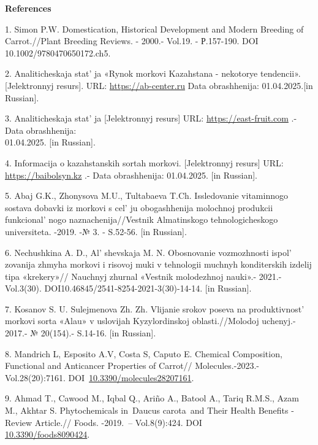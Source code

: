 \begin{center}
{\bfseries References}
\end{center}

\begin{refs}
1. Simon P.W. Domestication, Historical Development and Modern Breeding
of Carrot.//Plant Breeding Reviews. - 2000.- Vol.19. - Р.157-190. DOI
10.1002/9780470650172.ch5.

2. Analiticheskaja stat' ja «Rynok morkovi Kazahstana -
nekotorye tendencii». {[}Jelektronnyj resurs{]}.
URL: \href{https://ab-center.ru/news/rynok-morkovi-kazahstana-\/-\/-nekotorye-tendencii/}{https://ab-center.ru}
Data obrashhenija: 01.04.2025.{[}in Russian{]}.

3. Analiticheskaja stat' ja {[}Jelektronnyj resurs{]}
URL:
\href{https://east-fruit.com/novosti/na-nachalo-yanvarya-2022-goda-zapasy-morkovi-v-kazakhstane-prevyshali-200-tys-tonn/}{https://east-fruit.com} .-
Data obrashhenija: \\01.04.2025. {[}in Russian{]}.

4. Informacija o kazahstanskih sortah morkovi. {[}Jelektronnyj resurs{]}
URL:
\href{https://baibolsyn.kz/ru/semena/?search=\%D0\%BC\%D0\%BE\%D1\%80\%D0\%BA\%D0\%BE\%D0\%B2\%D1\%8C\&page=1/}{https://baibolsyn.kz} .-
Data obrashhenija: 01.04.2025. {[}in Russian{]}.

5. Abaj G.K., Zhonysova M.U., Tultabaeva T.Ch. Issledovanie vitaminnogo
sostava dobavki iz morkovi s cel' ju obogashhenija
molochnoj produkcii funkcional' nogo
naznachenija//Vestnik Almatinskogo tehno\-logicheskogo universiteta.
-2019. -№ 3. - S.52-56. {[}in Russian{]}.

6. Nechushkina A. D., Al' shevskaja M. N. Obosnovanie
vozmozhnosti ispol' zovanija zhmyha morkovi i risovoj
muki v tehnologii muchnyh konditerskih izdelij tipa «krekery»// Nauchnyj
zhurnal «Vestnik molodezhnoj nauki».- 2021.-Vol.3(30).
DOI10.46845/2541-8254-2021-3(30)-14-14. {[}in Russian{]}.

7. Kosanov S. U. Sulejmenova Zh. Zh. Vlijanie srokov poseva na
produktivnost'{} morkovi sorta «Alau» v uslovijah
Kyzylordinskoj oblasti.//Molodoj uchenyj.- 2017.- № 20(154).- S.14-16.
{[}in Russian{]}.

8. Mandrich L, Esposito A.V, Costa S, Caputo E. Chemical Composition,
Functional and Anticancer Properties of Carrot// Molecules.-2023.-
Vol.28(20):7161.
DOI~\href{https://doi.org/10.3390/molecules28207161}{10.3390/molecules28207161}.

9. Ahmad T., Cawood M., Iqbal Q., Ariño A., Batool A., Tariq R.M.S.,
Azam M., Akhtar S. Phytochemicals in~Daucus carota~and Their Health
Benefits -Review Article.// Foods. -2019.~-- Vol.8(9):424. DOI\\
\href{https://doi.org/10.3390/foods8090424}{10.3390/foods8090424}.


\end{refs}
